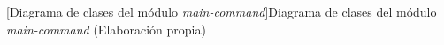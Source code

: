 \begin{myuml}[H]
    \begin{center}
    \end{center}
    [Diagrama de clases del módulo \textit{main-command}]{Diagrama de clases del módulo \textit{main-command} (Elaboración propia)}
    \label{dig:main-command}
\end{myuml}